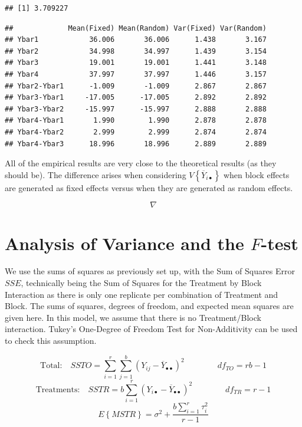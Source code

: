 \documentclass[
]{book}
\begin{document}
\begin{verbatim}
## [1] 3.709227
\end{verbatim}

\begin{verbatim}
##             Mean(Fixed) Mean(Random) Var(Fixed) Var(Random)
## Ybar1            36.006       36.006      1.438       3.167
## Ybar2            34.998       34.997      1.439       3.154
## Ybar3            19.001       19.001      1.441       3.148
## Ybar4            37.997       37.997      1.446       3.157
## Ybar2-Ybar1      -1.009       -1.009      2.867       2.867
## Ybar3-Ybar1     -17.005      -17.005      2.892       2.892
## Ybar3-Ybar2     -15.997      -15.997      2.888       2.888
## Ybar4-Ybar1       1.990        1.990      2.878       2.878
## Ybar4-Ybar2       2.999        2.999      2.874       2.874
## Ybar4-Ybar3      18.996       18.996      2.889       2.889
\end{verbatim}

All of the empirical results are very close to the theoretical results
(as they should be). The difference arises when considering
\(V\left\{\overline{Y}_{i\bullet}\right\}\) when block effects are
generated as fixed effects versus when they are generated as random
effects.

\[\nabla\]

\section{\texorpdfstring{Analysis of Variance and the
\(F\)-test}{Analysis of Variance and the F-test}}\label{analysis-of-variance-and-the-f-test}

We use the sums of squares as previously set up, with the Sum of Squares
Error \(SSE\), technically being the Sum of Squares for the Treatment by
Block Interaction as there is only one replicate per combination of
Treatment and Block. The sums of squares, degrees of freedom, and
expected mean squares are given here. In this model, we assume that
there is no Treatment/Block interaction. Tukey's One-Degree of Freedom
Test for Non-Additivity can be used to check this assumption.

\[
\mbox{Total:} \quad SSTO = \sum_{i=1}^r\sum_{j=1}^b \left(Y_{ij}-\overline{Y}_{\bullet\bullet}\right)^2 \qquad \qquad df_{TO}=rb-1 
\] \[
\mbox{Treatments:} \quad SSTR = 
b\sum_{i=1}^r \left(Y_{i\bullet}-\overline{Y}_{\bullet\bullet}\right)^2
\qquad \qquad df_{TR}=r-1 
\] \[
E\left\{MSTR\right\}=
\sigma^2+\frac{b\sum_{i=1}^r\tau_i^2}{r-1}
\]
\end{document}
